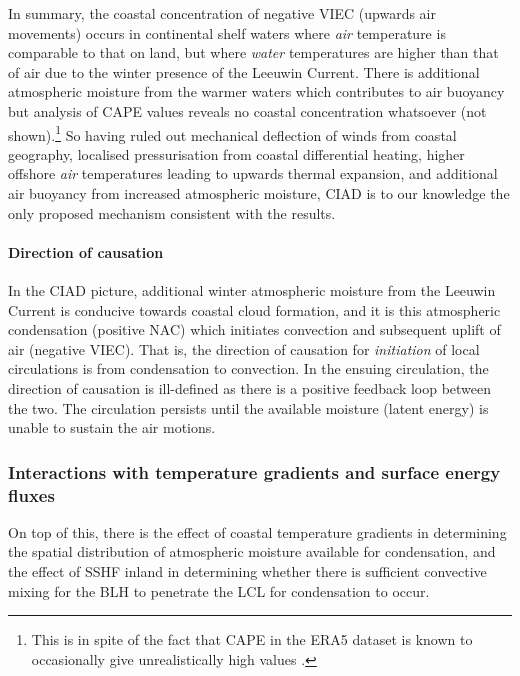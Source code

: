 In summary, the coastal concentration of negative \ac{VIEC} (upwards air movements) occurs in continental shelf waters where \textit{air} temperature is comparable to that on land, but where \textit{water} temperatures are higher than that of air due to the winter presence of the Leeuwin Current. There is additional atmospheric moisture from the warmer waters which contributes to air buoyancy but analysis of \ac{CAPE} values reveals no coastal concentration whatsoever (not shown).\footnote{This is in spite of the fact that \ac{CAPE} in the \ac{ERA5} dataset is known to occasionally give unrealistically high values \citep{ecmwf}.} So having ruled out mechanical deflection of winds from coastal geography, localised pressurisation from coastal differential heating, higher offshore \textit{air} temperatures leading to upwards thermal expansion, and additional air buoyancy from increased atmospheric moisture, \ac{CIAD} is to our knowledge the only proposed mechanism consistent with the results.

\paragraph{Direction of causation}

In the \ac{CIAD} picture, additional winter atmospheric moisture from the Leeuwin Current is conducive towards coastal cloud formation, and it is this atmospheric condensation (positive \ac{NAC}) which initiates convection and subsequent uplift of air (negative \ac{VIEC}). That is, the direction of causation for \textit{initiation} of local circulations is from condensation to convection. In the ensuing circulation, the direction of causation is ill-defined as there is a positive feedback loop between the two. The circulation persists until the available moisture (latent energy) is unable to sustain the air motions.

\subsubsection{Interactions with temperature gradients and surface energy fluxes}
\label{ssec:nac_t2}

On top of this, there is the effect of coastal temperature gradients in determining the spatial distribution of atmospheric moisture available for condensation, and the effect of \ac{SSHF} inland in determining whether there is sufficient convective mixing for the \ac{BLH} to penetrate the \ac{LCL} for condensation to occur.

